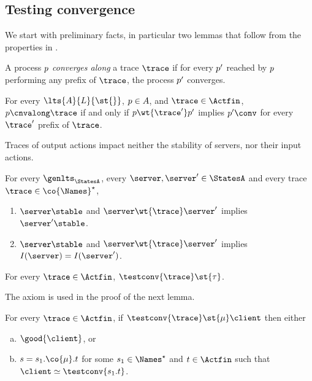 




\subsection{Testing convergence}
We start with preliminary facts, in particular two lemmas that follow
from the properties in .

A process $p$ {\em converges along} a trace $\trace$ if for every
$p'$ reached by $p$ performing any prefix of $\trace$, the
process $p'$ converges.

\begin{lemma}%
  \label{lem:cnvalong-iff-prefix}\label{lem:acnvalong-iff-prefix}
  For every $\lts{\States}{L}{\st{}}$, $p \in A$, and $\trace \in \Actfin$,
  $ \state \cnvalong \trace$ if and only if
  $ \state \wt{\trace'} \stateA $ implies $\stateA \conv$
  for every $\trace'$ prefix of $\trace$.
\end{lemma}


Traces of output actions impact neither the stability of servers,
nor their input actions.
\begin{lemma}
  \label{lem:st-wtout-st}  \label{lem:st-wtout-inp}
  For every $\genlts_\StatesA$,
  every $\server, \server' \in \StatesA$ and every trace $\trace \in \co{\Names}^\star$,
  \begin{enumerate}
    \item %
      $\server \stable$ and $\server \wt{ \trace } \server'$ implies $\server' \stable$.
    \item %
      $\server \stable$ and $\server \wt{ \trace } \server'$ implies $I(\server) = I(\server')$.
  \end{enumerate}
\end{lemma}



\begin{lemma}
  \label{lem:testconv-always-reduces}
  For every $\trace \in\Actfin$, $\testconv{ \trace} \st{\tau}$.
\end{lemma}


The \outputdeterminacyinv axiom is used in the proof of the next lemma.
\begin{lemma}
  \label{lem:inversion-gen-mu}
  For every $\trace \in \Actfin$, %
  if $\testconv{\trace} \st{ \mu } \client $
  then either
  \begin{enumerate}[(a)]
  \item\label{pt:inversion-gen-mu-left}
    $\good{ \client }$, or
  \item\label{pt:inversion-gen-mu-right}
    $s = \traceA. \co{\mu}. \traceB$ for some $\traceA \in \Names^{\star}$ and $\traceB \in \Actfin$
    such that $\client \simeq \testconv{\traceA.\traceB}$.
  \end{enumerate}
\end{lemma}


